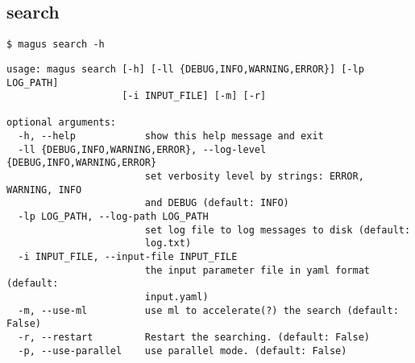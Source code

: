 \documentclass[12pt,oneside]{book}
\begin{document}
\subsection{search}
\begin{tcolorbox}
    \begin{verbatim}
$ magus search -h
    \end{verbatim}
    \tcblower
    \begin{verbatim}
usage: magus search [-h] [-ll {DEBUG,INFO,WARNING,ERROR}] [-lp LOG_PATH]
                    [-i INPUT_FILE] [-m] [-r]

optional arguments:
  -h, --help            show this help message and exit
  -ll {DEBUG,INFO,WARNING,ERROR}, --log-level {DEBUG,INFO,WARNING,ERROR}
                        set verbosity level by strings: ERROR, WARNING, INFO
                        and DEBUG (default: INFO)
  -lp LOG_PATH, --log-path LOG_PATH
                        set log file to log messages to disk (default:
                        log.txt)
  -i INPUT_FILE, --input-file INPUT_FILE
                        the input parameter file in yaml format (default:
                        input.yaml)
  -m, --use-ml          use ml to accelerate(?) the search (default: False)
  -r, --restart         Restart the searching. (default: False)
  -p, --use-parallel    use parallel mode. (default: False)
    \end{verbatim}
\end{tcolorbox}
\end{document}
